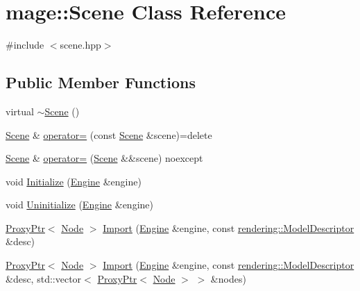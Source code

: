 \hypertarget{classmage_1_1_scene}{}\section{mage\+:\+:Scene Class Reference}
\label{classmage_1_1_scene}


{\ttfamily \#include $<$scene.\+hpp$>$}

\subsection*{Public Member Functions}
\begin{DoxyCompactItemize}
\item 
virtual \mbox{\hyperlink{classmage_1_1_scene_adc40910fdca62586659c2961fe7e7f3c}{$\sim$\+Scene}} ()
\item 
\mbox{\hyperlink{classmage_1_1_scene}{Scene}} \& \mbox{\hyperlink{classmage_1_1_scene_a2c25c0fedc0230771d8c00a8288a69ce}{operator=}} (const \mbox{\hyperlink{classmage_1_1_scene}{Scene}} \&scene)=delete
\item 
\mbox{\hyperlink{classmage_1_1_scene}{Scene}} \& \mbox{\hyperlink{classmage_1_1_scene_a0256a5b54db093088f40511cf61eb277}{operator=}} (\mbox{\hyperlink{classmage_1_1_scene}{Scene}} \&\&scene) noexcept
\item 
void \mbox{\hyperlink{classmage_1_1_scene_a0edb77d5e45bd1822793d189a45fbb5c}{Initialize}} (\mbox{\hyperlink{classmage_1_1_engine}{Engine}} \&engine)
\item 
void \mbox{\hyperlink{classmage_1_1_scene_a3fd909919f832b122bb3cd205c9beb2c}{Uninitialize}} (\mbox{\hyperlink{classmage_1_1_engine}{Engine}} \&engine)
\item 
\mbox{\hyperlink{classmage_1_1_proxy_ptr}{Proxy\+Ptr}}$<$ \mbox{\hyperlink{classmage_1_1_node}{Node}} $>$ \mbox{\hyperlink{classmage_1_1_scene_a03490fe422fdfa110a6d3b58c31d1bb4}{Import}} (\mbox{\hyperlink{classmage_1_1_engine}{Engine}} \&engine, const \mbox{\hyperlink{classmage_1_1rendering_1_1_model_descriptor}{rendering\+::\+Model\+Descriptor}} \&desc)
\item 
\mbox{\hyperlink{classmage_1_1_proxy_ptr}{Proxy\+Ptr}}$<$ \mbox{\hyperlink{classmage_1_1_node}{Node}} $>$ \mbox{\hyperlink{classmage_1_1_scene_ac3ac7fd6eb1e6f59626b65f3da8553a4}{Import}} (\mbox{\hyperlink{classmage_1_1_engine}{Engine}} \&engine, const \mbox{\hyperlink{classmage_1_1rendering_1_1_model_descriptor}{rendering\+::\+Model\+Descriptor}} \&desc, std\+::vector$<$ \mbox{\hyperlink{classmage_1_1_proxy_ptr}{Proxy\+Ptr}}$<$ \mbox{\hyperlink{classmage_1_1_node}{Node}} $>$ $>$ \&nodes)

\end{DoxyCompactItemize}
